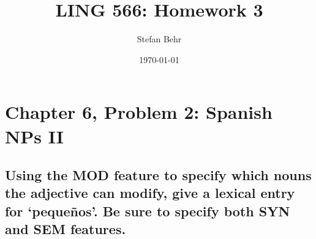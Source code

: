 \documentclass{article}
\title{LING 566: Homework 3}
\author{Stefan Behr}
\date{\today}
\begin{document}
\maketitle

\renewcommand{\thesubsection}{\Alph{subsection}.}

\section{Chapter 6, Problem 2: Spanish NPs II}

\subsection{Using the MOD feature to specify which nouns the adjective can modify, give a lexical entry for `peque\~nos'. Be sure to specify both SYN and SEM features.}
\end{document}
